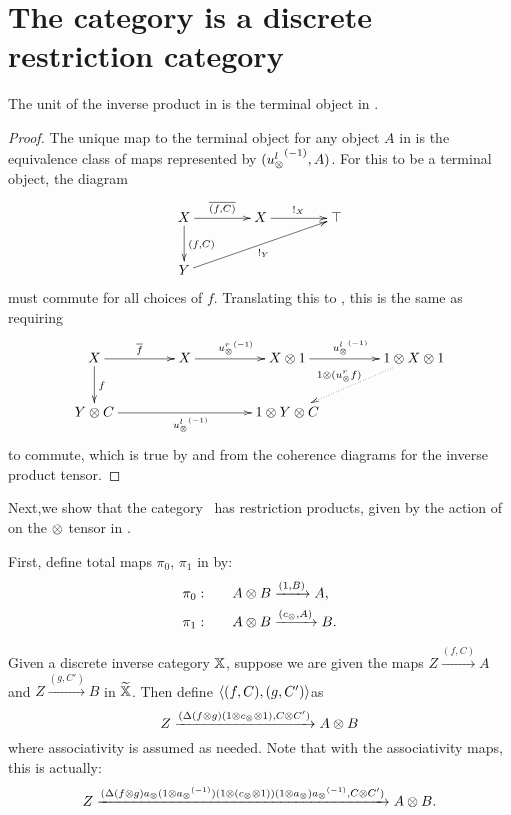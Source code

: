 \section{The category \hypXt is a discrete restriction category} %
\label{sec:the_category_hypxt_is_cartesian}



\begin{lemma}\label{lem:tensor_unit_of_x_is_terminal_object_of_xt}
  The unit of the inverse product in \X is the terminal object in \Xt.
\end{lemma}
\begin{proof}
  The unique map to the terminal object for any object $A$ in \Xt is the equivalence class of maps
  represented by $({u_{\otimes}^l}^{(-1)},A)$. For this to be a terminal object, the diagram
  \[
    \xymatrix @C=40pt @R=25pt{
      X \ar[r]^{\restr{(f,C)}} \ar[d]^{(f,C)} & X \ar[r]^{!_X}  &\top  \\
      Y \ar[urr]_{!_Y}
    }
  \]
  must commute for all choices of $f$. Translating this to \X, this is the same as requiring
  \[
    \xymatrix @C=40pt @R=25pt{
      X \ar[r]^{\restr{f}} \ar[d]^{f} & X \ar[r]^{\inv{\usr} }
      & X\*1 \ar[r]^{\inv{\usl}}  &1\*X\*1 \ar@{.>}[dl]_{1\*(\usr f)}  \\
      Y \*C\ar[rr]_{\inv{\usl}} & & 1 \*Y \* C
    }
  \]
  to commute, which is true by \rone and from the coherence diagrams for the inverse product tensor.
\end{proof}

Next,we show that the category \Xt\ has restriction products, given by the action of \wtc on
the $\otimes$ tensor in \X.

First, define total maps $\pi_0$, $\pi_1$ in \Xt by:
\begin{align}
  \pi_0:\qquad & A \otimes B \xrightarrow{(1,B)} A, \label{eq:defn:pia}\\
  \pi_1:\qquad & A \otimes B \xrightarrow{(c_{\otimes},A)} B. \label{eq:defn:pib}
\end{align}

\begin{definition}\label{def:product_map_in_xt}
  Given a discrete inverse category $\mathbb{X}$, suppose we are given the maps $ Z \xrightarrow{(f,C)} A$
  and $Z \xrightarrow{(g,C')} B$ in $\widetilde{\mathbb{X}}$. Then define $\langle(f,C),(g,C')\rangle$as
  \begin{equation}
    Z\xrightarrow{(\Delta  ( f \otimes g )  (1\otimes c_{\otimes} \otimes 1), C\otimes C')} A \otimes B\label{eq:defn:fg}
  \end{equation}
  where associativity is assumed as needed. Note that with the associativity maps, this is actually:
  \begin{equation}
    Z\xrightarrow{(\Delta  ( f \otimes g )  a_{\otimes} (1\otimes{a_{\otimes}}^{(-1)})
      (1\otimes (c_{\otimes} \otimes 1)) (1\otimes a_{\otimes}) {a_{\otimes}}^{(-1)}, C\otimes C')} A \otimes B.\label{eq:defn:fg2}
  \end{equation}
\end{definition}


